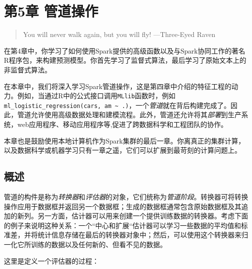 \documentclass[
]{article}
\begin{document}
\hypertarget{ux7b2c5ux7ae0-ux7ba1ux9053ux64cdux4f5c}{%
\section{第5章 管道操作}\label{ux7b2c5ux7ae0-ux7ba1ux9053ux64cdux4f5c}}

\begin{quote}
You will never walk again, but you will fly! ---Three-Eyed Raven
\end{quote}

在第4章中，你学习了如何使用Spark提供的高级函数以及与Spark协同工作的著名R程序包，来构建预测模型。你首先学习了监督式算法，最后学习了原始文本上的非监督式算法。

在本章中，我们将深入学习Spark管道操作，这是第四章中介绍的特征工程的动力。例如，当通过R中的公式接口调用\texttt{MLlib}函数时，例如\texttt{ml\_logistic\_regression(cars,\ am\ \textasciitilde{}\ .)}，一个\emph{管道}就在背后构建完成了。因此，管道允许使用高级数据处理和建模流程。此外，管道还允许将其\emph{部署}到生产系统，web应用程序、移动应用程序等,促进了跨数据科学和工程团队的协作。

本章也是鼓励使用本地计算机作为Spark集群的最后一章。你离真正的集群计算，以及数据科学或机器学习只有一章之遥，它们可以扩展到最苛刻的计算问题上。

\hypertarget{ux6982ux8ff0-4}{%
\subsection{概述}\label{ux6982ux8ff0-4}}

管道的构件是称为\emph{转换器}和\emph{评估器}的对象，它们统称为\emph{管道阶段}。转换器可将转换操作应用于数据框并返回另一个数据框；生成的数据框通常包含原始数据框及其追加的新列。另一方面，估计器可以用来创建一个提供训练数据的转换器。考虑下面的例子来说明这种关系：一个``中心和扩展``估计器可以学习一些数据的平均值和标准差，并将统计信息存储在最后的转换器对象中；然后，可以使用这个转换器来归一化它所训练的数据以及任何新的、但看不见的数据。

这里是定义一个评估器的过程：
\end{document}
